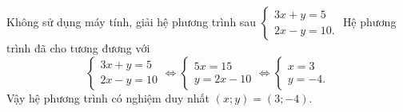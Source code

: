 \begin{ex}%
Không sử dụng máy tính, giải hệ phương trình sau $\begin{cases} 3x+y=5 \\ 2x-y=10. \end{cases}$
	\loigiai
	{
Hệ phương trình đã cho tương đương với
		$$\begin{cases} 3x+y=5 \\ 2x-y=10 \end{cases}
		\Leftrightarrow \begin{cases} 5x=15 \\ y=2x-10 \end{cases}
		\Leftrightarrow \begin{cases} x=3 \\ y=-4. \end{cases}$$
		Vậy hệ phương trình có nghiệm duy nhất $(x;y)=(3;-4)$.
	}
\end{ex}

